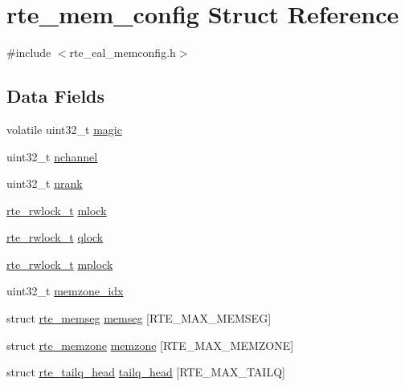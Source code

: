 \hypertarget{structrte__mem__config}{}\section{rte\+\_\+mem\+\_\+config Struct Reference}
\label{structrte__mem__config}


{\ttfamily \#include $<$rte\+\_\+eal\+\_\+memconfig.\+h$>$}

\subsection*{Data Fields}
\begin{DoxyCompactItemize}
\item 
volatile uint32\+\_\+t \hyperlink{structrte__mem__config_a199149e6c37b30c03fa42cf555ce8265}{magic}
\item 
uint32\+\_\+t \hyperlink{structrte__mem__config_a5874f4bcabbfe0fd765d5129d629eabf}{nchannel}
\item 
uint32\+\_\+t \hyperlink{structrte__mem__config_a59a112650302067fe308c24133e44d7e}{nrank}
\item 
\hyperlink{structrte__rwlock__t}{rte\+\_\+rwlock\+\_\+t} \hyperlink{structrte__mem__config_abe00da43deb96cb01a845ec14091a9c8}{mlock}
\item 
\hyperlink{structrte__rwlock__t}{rte\+\_\+rwlock\+\_\+t} \hyperlink{structrte__mem__config_a7467e2dc92b59ca2fdfc24a43615c6ee}{qlock}
\item 
\hyperlink{structrte__rwlock__t}{rte\+\_\+rwlock\+\_\+t} \hyperlink{structrte__mem__config_a73b054303f54aa1245ac1fe315c930ec}{mplock}
\item 
uint32\+\_\+t \hyperlink{structrte__mem__config_a678943999c92d21217de78b08a6e9932}{memzone\+\_\+idx}
\item 
struct \hyperlink{structrte__memseg}{rte\+\_\+memseg} \hyperlink{structrte__mem__config_a37677c0bd56a3232877182f1a1b64a37}{memseg} \mbox{[}R\+T\+E\+\_\+\+M\+A\+X\+\_\+\+M\+E\+M\+S\+E\+G\mbox{]}
\item 
struct \hyperlink{structrte__memzone}{rte\+\_\+memzone} \hyperlink{structrte__mem__config_abec5328c0274d906b74bb04c5143021d}{memzone} \mbox{[}R\+T\+E\+\_\+\+M\+A\+X\+\_\+\+M\+E\+M\+Z\+O\+N\+E\mbox{]}
\item 
struct \hyperlink{structrte__tailq__head}{rte\+\_\+tailq\+\_\+head} \hyperlink{structrte__mem__config_a63f874fec11e96c59fefda7e24b7c681}{tailq\+\_\+head} \mbox{[}R\+T\+E\+\_\+\+M\+A\+X\+\_\+\+T\+A\+I\+L\+Q\mbox{]}
\end{DoxyCompactItemize}


